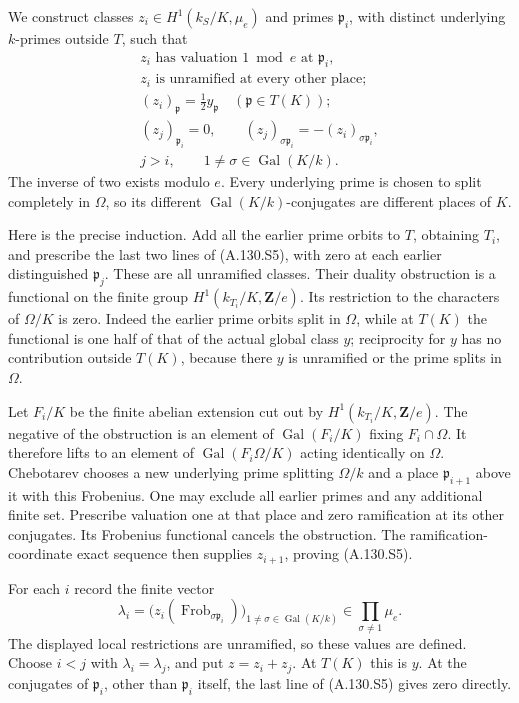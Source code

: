 We construct classes \(z_i\in H^1(k_S/K,\mu_e)\) and primes
\(\mathfrak p_i\), with distinct underlying \(k\)-primes
outside \(T\), such that
\[
\begin{gathered}
 z_i\text{ has valuation }1\bmod e\text{ at }\mathfrak p_i,\\
 z_i\text{ is unramified at every other place};\\
 (z_i)_{\mathfrak p}=\tfrac12y_{\mathfrak p}
                                     \quad(\mathfrak p\in T(K));\\
 (z_j)_{\mathfrak p_i}=0,\qquad
 (z_j)_{\sigma\mathfrak p_i}=-(z_i)_{\sigma\mathfrak p_i},\\
 j>i,\qquad 1\ne\sigma\in\operatorname{Gal}(K/k).
\end{gathered}
 \tag{A.130.S5}
\]
The inverse of two exists modulo \(e\).
Every underlying prime is chosen to split completely in
\(\Omega\), so its different \(\operatorname{Gal}(K/k)\)-conjugates
are different places of \(K\).

Here is the precise induction.  Add all the earlier prime
orbits to \(T\), obtaining \(T_i\), and prescribe the last
two lines of (A.130.S5), with zero at each earlier distinguished
\(\mathfrak p_j\).  These are all unramified classes.
Their duality obstruction is a functional on the finite group
\(H^1(k_{T_i}/K,\mathbf Z/e)\).
Its restriction to the characters of \(\Omega/K\) is zero.
Indeed the earlier prime orbits split in \(\Omega\), while
at \(T(K)\) the functional is one half of that of the actual
global class \(y\); reciprocity for \(y\) has no contribution
outside \(T(K)\), because there \(y\) is unramified or the
prime splits in \(\Omega\).

Let \(F_i/K\) be the finite abelian extension cut out by
\(H^1(k_{T_i}/K,\mathbf Z/e)\).
The negative of the obstruction is an element of
\(\operatorname{Gal}(F_i/K)\) fixing \(F_i\cap\Omega\).
It therefore lifts to an element of
\(\operatorname{Gal}(F_i\Omega/K)\) acting identically on
\(\Omega\).  Chebotarev chooses a new underlying prime
splitting \(\Omega/k\) and a place \(\mathfrak p_{i+1}\)
above it with this Frobenius.  One may exclude all earlier
primes and any additional finite set.
Prescribe valuation one at that place and zero ramification
at its other conjugates.  Its Frobenius functional cancels
the obstruction.  The ramification-coordinate exact sequence
then supplies \(z_{i+1}\), proving (A.130.S5).

For each \(i\) record the finite vector
\[
 \lambda_i=\bigl(
 z_i(\operatorname{Frob}_{\sigma\mathfrak p_i})
                \bigr)_{1\ne\sigma\in\operatorname{Gal}(K/k)}
        \in\prod_{\sigma\ne1}\mu_e.
 \tag{A.130.S6}
\]
The displayed local restrictions are unramified, so these
values are defined.  Choose \(i<j\) with
\(\lambda_i=\lambda_j\), and put \(z=z_i+z_j\).
At \(T(K)\) this is \(y\).  At the conjugates of
\(\mathfrak p_i\), other than \(\mathfrak p_i\) itself,
the last line of (A.130.S5) gives zero directly.

